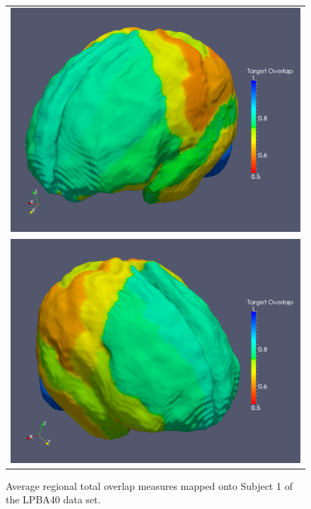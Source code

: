 \documentclass{llncs}
\begin{document}
\begin{figure}
\centering
\begin{tabular}{c}
  \includegraphics[width=120mm]{Figures/leftHemisphere.png} \\
  \includegraphics[width=120mm]{Figures/rightHemisphere.png}
\end{tabular}
\caption{Average regional total overlap measures mapped onto Subject 1
of the LPBA40 data set.}
\label{fig:lpba40}
\end{figure}

\setlength{\tabcolsep}{4pt}
\end{document}
